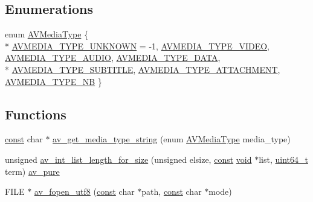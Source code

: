 \subsection*{Enumerations}
\begin{DoxyCompactItemize}
\item 
enum \hyperlink{group__lavu__misc_ga9a84bba4713dfced21a1a56163be1f48}{A\+V\+Media\+Type} \{ \\*
\hyperlink{group__lavu__misc_gga9a84bba4713dfced21a1a56163be1f48afdadbd6c4f612c59f6b6c7c6f84fd347}{A\+V\+M\+E\+D\+I\+A\+\_\+\+T\+Y\+P\+E\+\_\+\+U\+N\+K\+N\+O\+WN} = -\/1, 
\hyperlink{group__lavu__misc_gga9a84bba4713dfced21a1a56163be1f48ac1a46f59be5c6c2d3412ab172d6b8cf5}{A\+V\+M\+E\+D\+I\+A\+\_\+\+T\+Y\+P\+E\+\_\+\+V\+I\+D\+EO}, 
\hyperlink{group__lavu__misc_gga9a84bba4713dfced21a1a56163be1f48a7b4e33b8f30ac94d34ce8d9f7c33927a}{A\+V\+M\+E\+D\+I\+A\+\_\+\+T\+Y\+P\+E\+\_\+\+A\+U\+D\+IO}, 
\hyperlink{group__lavu__misc_gga9a84bba4713dfced21a1a56163be1f48ae3df4d77c6908fb626293c2fed215d52}{A\+V\+M\+E\+D\+I\+A\+\_\+\+T\+Y\+P\+E\+\_\+\+D\+A\+TA}, 
\\*
\hyperlink{group__lavu__misc_gga9a84bba4713dfced21a1a56163be1f48aa64a67386a9c53360744b86e4707b831}{A\+V\+M\+E\+D\+I\+A\+\_\+\+T\+Y\+P\+E\+\_\+\+S\+U\+B\+T\+I\+T\+LE}, 
\hyperlink{group__lavu__misc_gga9a84bba4713dfced21a1a56163be1f48a2d09f16df8631e64e8fa566142cdc99d}{A\+V\+M\+E\+D\+I\+A\+\_\+\+T\+Y\+P\+E\+\_\+\+A\+T\+T\+A\+C\+H\+M\+E\+NT}, 
\hyperlink{group__lavu__misc_gga9a84bba4713dfced21a1a56163be1f48a8e220e09ef38f26963e8e2ec731fb7d9}{A\+V\+M\+E\+D\+I\+A\+\_\+\+T\+Y\+P\+E\+\_\+\+NB}
 \}
\end{DoxyCompactItemize}
\subsection*{Functions}
\begin{DoxyCompactItemize}
\item 
\hyperlink{getopt1_8c_a2c212835823e3c54a8ab6d95c652660e}{const} char $\ast$ \hyperlink{group__lavu__misc_gaf21645cfa855b2caf9699d7dc7b2d08e}{av\+\_\+get\+\_\+media\+\_\+type\+\_\+string} (enum \hyperlink{group__lavu__misc_ga9a84bba4713dfced21a1a56163be1f48}{A\+V\+Media\+Type} media\+\_\+type)
\item 
unsigned \hyperlink{group__lavu__misc_ga7894e9b1ec8844685bc9101779c7d533}{av\+\_\+int\+\_\+list\+\_\+length\+\_\+for\+\_\+size} (unsigned elsize, \hyperlink{getopt1_8c_a2c212835823e3c54a8ab6d95c652660e}{const} \hyperlink{sound_8c_ae35f5844602719cf66324f4de2a658b3}{void} $\ast$list, \hyperlink{lib-src_2ffmpeg_2win32_2stdint_8h_aec6fcb673ff035718c238c8c9d544c47}{uint64\+\_\+t} term) \hyperlink{attributes_8h_adc7fd5bb40d84900a3a30ef3318020c2}{av\+\_\+pure}
\item 
F\+I\+LE $\ast$ \hyperlink{group__lavu__misc_ga553b85a36da32c041738a89aa61f9fbd}{av\+\_\+fopen\+\_\+utf8} (\hyperlink{getopt1_8c_a2c212835823e3c54a8ab6d95c652660e}{const} char $\ast$path, \hyperlink{getopt1_8c_a2c212835823e3c54a8ab6d95c652660e}{const} char $\ast$mode)
\end{DoxyCompactItemize}


